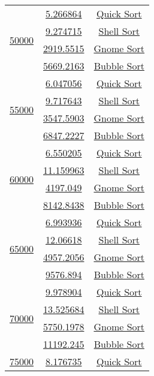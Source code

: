 \begin{lrbox}{\sorttime}
\begin{tabular}{|c|c|c|}
 \multirow{4}{*}{\href{T1.36.0}{50000}} & {\href{T1.36.1}{5.266864}} & {\href{T1.36.2}{Quick Sort}}\\
\cline{2-3}
 & {\href{T1.37.1}{9.274715}} & {\href{T1.37.2}{Shell Sort}}\\
\cline{2-3}
 & {\href{T1.39.1}{2919.5515}} & {\href{T1.39.2}{Gnome Sort}}\\
\cline{2-3}
 & {\href{T1.38.1}{5669.2163}} & {\href{T1.38.2}{Bubble Sort}}\\
\hline
 \multirow{4}{*}{\href{T1.42.0}{55000}} & {\href{T1.40.1}{6.047056}} & {\href{T1.40.2}{Quick Sort}}\\
\cline{2-3}
 & {\href{T1.41.1}{9.717643}} & {\href{T1.41.2}{Shell Sort}}\\
\cline{2-3}
 & {\href{T1.43.1}{3547.5903}} & {\href{T1.43.2}{Gnome Sort}}\\
\cline{2-3}
 & {\href{T1.42.1}{6847.2227}} & {\href{T1.42.2}{Bubble Sort}}\\
\hline
 \multirow{4}{*}{\href{T1.44.0}{60000}} & {\href{T1.44.1}{6.550205}} & {\href{T1.44.2}{Quick Sort}}\\
\cline{2-3}
 & {\href{T1.45.1}{11.159963}} & {\href{T1.45.2}{Shell Sort}}\\
\cline{2-3}
 & {\href{T1.47.1}{4197.049}} & {\href{T1.47.2}{Gnome Sort}}\\
\cline{2-3}
 & {\href{T1.46.1}{8142.8438}} & {\href{T1.46.2}{Bubble Sort}}\\
\hline
 \multirow{4}{*}{\href{T1.51.0}{65000}} & {\href{T1.48.1}{6.993936}} & {\href{T1.48.2}{Quick Sort}}\\
\cline{2-3}
 & {\href{T1.49.1}{12.06618}} & {\href{T1.49.2}{Shell Sort}}\\
\cline{2-3}
 & {\href{T1.51.1}{4957.2056}} & {\href{T1.51.2}{Gnome Sort}}\\
\cline{2-3}
 & {\href{T1.50.1}{9576.894}} & {\href{T1.50.2}{Bubble Sort}}\\
\hline
 \multirow{4}{*}{\href{T1.52.0}{70000}} & {\href{T1.52.1}{9.978904}} & {\href{T1.52.2}{Quick Sort}}\\
\cline{2-3}
 & {\href{T1.53.1}{13.525684}} & {\href{T1.53.2}{Shell Sort}}\\
\cline{2-3}
 & {\href{T1.55.1}{5750.1978}} & {\href{T1.55.2}{Gnome Sort}}\\
\cline{2-3}
 & {\href{T1.54.1}{11192.245}} & {\href{T1.54.2}{Bubble Sort}}\\
\hline
 \multirow{4}{*}{\href{T1.57.0}{75000}} & {\href{T1.56.1}{8.176735}} & {\href{T1.56.2}{Quick Sort}}\\

\end{tabular}
\end{lrbox}
